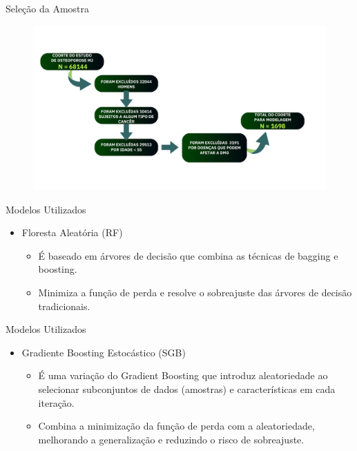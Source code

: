 \begin{frame}{Seleção da Amostra}
	\begin{figure}[h]
		\includegraphics[width=1.1\linewidth, height = !]{imagens//secao3/selecao.png}
	\end{figure}
\end{frame}

\begin{frame}{Modelos Utilizados}
	\begin{itemize}
		\item Floresta Aleatória (RF)
		\begin{itemize}
			\item É baseado em árvores de decisão que combina as técnicas de bagging e boosting.
			\item Minimiza a função de perda e resolve o sobreajuste das árvores de decisão tradicionais.
		\end{itemize}
	\end{itemize}
\end{frame}


\begin{frame}{Modelos Utilizados}
	\begin{itemize}
		\item Gradiente Boosting Estocástico (SGB)
		\begin{itemize}
			\item É uma variação do Gradient Boosting que introduz aleatoriedade ao selecionar subconjuntos de dados (amostras) e características em cada iteração.
			\item Combina a minimização da função de perda com a aleatoriedade, melhorando a generalização e reduzindo o risco de sobreajuste.
		\end{itemize}
	\end{itemize}
\end{frame}

